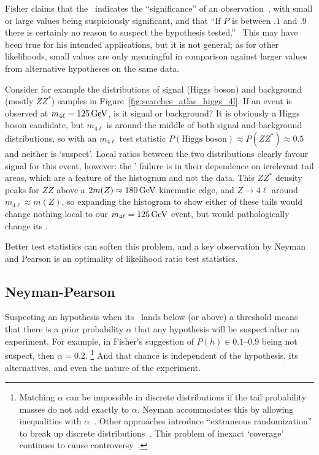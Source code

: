 Fisher claims that the \pvalue\ indicates the ``significance'' of an
observation~\cite{fisher1925smrw}, with small or large values being
suspiciously significant, and that
``If $P$ is between $.1$ and $.9$ there is certainly no reason to suspect the
hypothesis tested.''~\cite{fisher1925smrw}
This may have been true for his intended applications, but it is not general;
as for other likelihoods, small values are only meaningful in comparison
against larger values from alternative hypotheses on the same data.

Consider for example the distributions of signal (Higgs boson) and background
(mostly $ZZ^*$) samples in Figure~\ref{fig:searches_atlas_higgs_4l}.
If an event is observed at $m_{4\ell} = 125\,\eV[G]$, is it signal or
background?
It is obviously a Higgs boson candidate, but $m_{4\ell}$ is around the middle
of both signal and background distributions, so with an $m_{4\ell}$ test
statistic $P(\textrm{Higgs boson}) \approx P(ZZ^*) \approx 0.5$ and neither
is `suspect'.
Local ratios between the two distributions clearly favour signal for this
event, however:
the \pvalues' failure is in their dependence on irrelevant tail areas,
which are a feature of the histogram and not the data.
This $ZZ^*$ density peaks for $ZZ$ above a
$2 m(Z) \approx 180\,\eV[G]$ kinematic edge,
and $Z \to 4\ell$ around $m_{4\ell} \approx m(Z)$,
so expanding the histogram to show either of these tails would change nothing
local to our $m_{4\ell} = 125\,\eV[G]$ event, but would pathologically change
its \pvalues.

Better test statistics can soften this problem, and a key observation by
Neyman and Pearson is an optimality of likelihood ratio test statistics.


\subsection{Neyman-Pearson}
\label{sec:searches_np}
Suspecting an hypothesis when its \pvalue\ lands below (or above) a threshold
means that there is a prior probability $\alpha$ that any hypothesis will be
suspect after an experiment.
For example, in Fisher's suggestion of $P(h) \in 0.1\textrm{--}0.9$ being not
suspect, then $\alpha = 0.2$.%
\footnote{%
Matching $\alpha$ can be impossible in discrete distributions if
the tail probability masses do not add exactly to $\alpha$.
Neyman accommodates this by allowing inequalities with $\alpha$~\cite{
neyman1935Intervals
}.
Other approaches introduce ``extraneous randomization'' to
break up discrete distributions~\cite{tocher1950discontinuous}.
This problem of inexact `coverage' continues to cause controversy~\cite{
Read2002cls,
Feldman:1997qc,
cousins2008evaluation,
Cranmer2006Statistical
}.%
}
And that chance is independent of the hypothesis, its alternatives, and even
the nature of the experiment.

